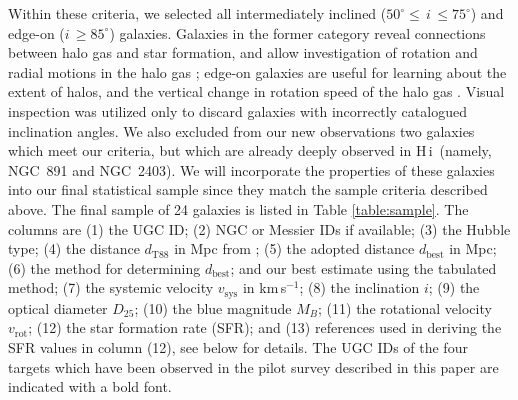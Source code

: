 \documentclass[oldversion]{aa}
\newcommand{\HI}{{\sc H\,i}}
\begin{document}
Within these criteria, we selected all intermediately inclined ($50^{\circ}\leq\,i\,\leq75^{\circ}$) and edge-on ($i\,\geq85^{\circ}$) galaxies. Galaxies in the former category reveal connections between halo gas and star formation, and allow investigation of rotation and radial motions in the halo gas \citep[e.g.][]{fraternali_etal_2002}; edge-on galaxies are useful for learning about the extent of halos, and the vertical change in rotation speed of the halo gas \citep[e.g.][]{oosterloo_etal_2007}. Visual inspection was utilized only to discard galaxies with incorrectly catalogued inclination angles. We also excluded from our new observations two galaxies which meet our criteria, but which are already deeply observed in \HI\ (namely, NGC~891 and NGC~2403). We will incorporate the properties of these galaxies into our final statistical sample since they match the sample criteria described above. The final sample of 24 galaxies is listed in Table \ref{table:sample}. The columns are (1) the UGC ID; (2) NGC or Messier IDs if available; (3) the Hubble type; (4) the distance $d_\mathrm{T88}$ in Mpc from \citet{tully_1988}; (5) the adopted distance $d_\mathrm{best}$ in Mpc; (6) the method for determining $d_\mathrm{best}$; and our best estimate using the tabulated method; (7) the systemic velocity $v_{\mathrm{sys}}$ in km\,s$^{-1}$; (8) the inclination $i$; (9) the optical diameter $D_{25}$; (10) the blue magnitude $M_B$; (11) the rotational velocity $v_{\mathrm{rot}}$; (12) the star formation rate (SFR); and (13) references used in deriving the SFR values in column (12), see below for details. The UGC IDs of the four targets which have been observed in the pilot survey described in this paper are indicated with a bold font.
\end{document}
